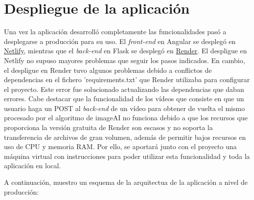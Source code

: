 \section{Despliegue de la aplicación}
Una vez la aplicación desarrolló completamente las funcionalidades pasó a desplegarse a producción para su uso. El \textit{front-end} en Angular se desplegó en \href{https://www.netlify.com/}{Netlify}, mientras que el \textit{back-end} en Flask se desplegó en \href{https://render.com//}{Render}.
El despligue en Netlify no supuso mayores problemas que seguir los pasos indicados. En cambio, el despligue en Render tuvo algunos problemas debido a conflictos de dependencias en el fichero 'requirements.txt' que Render utilizaba para configurar el proyecto. Este error fue solucionado actualizando las dependencias que daban errores. Cabe destacar que la funcionalidad de los vídeos que consiste en que un usuario haga un POST al \textit{back-end} de un vídeo para obtener de vuelta el mismo procesado por el algoritmo de imageAI no funciona debido a que los recursos que proporciona la versión gratuita de Render son escasos y no soporta la transferencia de archivos de gran volumen, además de permitir bajos recursos en uso de CPU y memoria RAM. Por ello, se aportará junto con el proyecto una máquina virtual con instrucciones para poder utilizar esta funcionalidad y toda la aplicación en local. 


A continuación, muestro un esquema de la arquitectua de la aplicación a nivel de producción:

